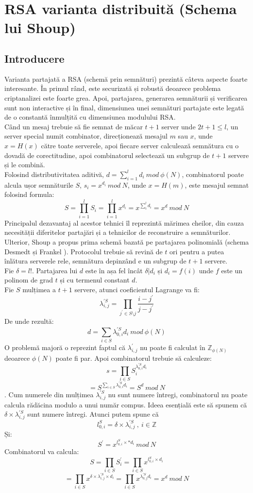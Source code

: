 \documentclass[12]{report}
\begin{document}
\section{RSA varianta distribuită (Schema lui Shoup)}
\subsection{Introducere}
Varianta partajată a RSA (schemă prin semnături) prezintă câteva aspecte foarte interesante. În primul rând, este securizată și robustă deoarece problema criptanalizei este foarte grea. Apoi, partajarea, generarea semnăturii și verificarea sunt non interactive și în final, dimensiunea unei semnături partajate este legată de o constantă înmulțită cu dimensiunea modulului RSA. \\
Când un mesaj trebuie să fie semnat de măcar $ t+1 $ server unde $ 2t+1 \leqslant l $, un server special numit combinator, direcționează mesajul $m$ sau $x$, unde $x=H(x)$ către toate serverele, apoi fiecare server calculează semnătura cu o dovadă de corectitudine, apoi combinatorul selectează un subgrup de $t+1$ servere și le combină. \\
Folosind distributivitatea aditivă, $d=\sum_{i=1}^{l} d_i \ mod \ \phi(N)$, combinatorul poate alcula ușor semnăturile $S$, $s_i=x^{d_i} \ mod \ N$, unde $x=H(m)$, este mesajul semnat folosind formula:
$$ S= \prod_{i=1}^{l} S_i = \prod_{i=1}^{l} x^{d_i} = x^{\sum_{i}^{l} d_i} = x^d \ mod \ N $$
Principalul dezavantaj al acestor tehnici îl reprezintă mărimea cheilor, din cauza necesității diferitelor partajări și a tehnicilor de reconstruire a semnăturilor. Ulterior, Shoup a propus prima schemă bazată pe partajarea polinomială (schema Desmedt și Frankel \cite{desmet}). Protocolul trebuie să revină de $t$ ori pentru a putea înlătura serverele rele, semnătura depinzând e un subgrup de $t+1$ servere. \\
Fie $\delta =l!$. Partajarea lui $d$ este în așa fel încât $\delta | d_i$ și $d_i =f(i)$ unde $f$ este un polinom de grad $t$ și cu termenul constant $d$. \\
Fie $S$ mulțimea a $t+1$ servere, atunci coeficientul Lagrange va fi: 
$$ \lambda_{i,j}^{'S} = \prod_{j^{'} \in S \setminus j}^{} \frac{i-j^{'}}{j-j^{'}}   $$
De unde rezultă:
$$ d= \sum_{i \in S}^{} \lambda_{0,i}^{'S} d_i \ mod \ \phi(N)$$
O problemă majoră o reprezint faptul că $\lambda_{i,j}^{'}$ nu poate fi calculat în $\mathbb{Z}_{\phi(N)}$ deoarece $\phi(N)$ poate fi par. Apoi combinatorul trebuie să calculeze:
$$s=\prod_{i \in S}^{} S_{i}^{\lambda_{0,i}^{'S} d_i}$$
$$ = S^{\sum_{i \in S}^{}\lambda_{0,i}^{'S} d_i} = S^d \ mod \ N$$.
Cum numerele din mulțimea $ \lambda_{i,j}^{'S}$ nu sunt numere întregi, combinatorul nu poate calcula rădăcina modulo a unui număr compus. Ideea esențială este să spunem că $\delta \times \lambda_{i,j}^{'S}$ sunt numere întregi. Atunci putem spune că 
$$l_{0,i}^{S} = \delta \times \lambda_{i,j}^{'S} \ , \ i \in \mathbb{Z} $$
Și:
$$ S^{'} = x^{l_{0,i}^{S} \times * d_i } \ mod \ N   $$
Combinatorul va calcula:
$$S = \prod_{i \in S}^{} S_{i}^{'} = \prod_{i \in S}^{} x^{l_{0,i}^{S} \times d_i    } $$
$$ = \prod_{i \in S}^{}  x^{\delta \times \lambda_{i,j}^{'S} \times d_i} = \prod_{i \in S}^{} 
x^{\lambda_{0,j}^{'S} d_i} = x^d \ mod \ N  $$
\end{document}
